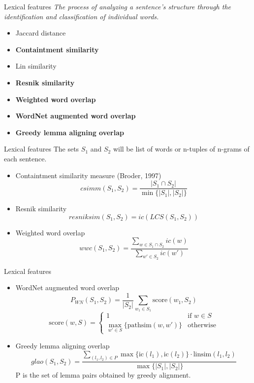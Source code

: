 \begin{frame}{Lexical features}
    \textit{The process of analyzing a sentence's structure through the identification and classification of individual words.}
    \vspace{0.5cm}
    \begin{itemize}
        \item Jaccard distance 
        \item \textbf{Containtment similarity}
        \item Lin similarity 
        \item \textbf{Resnik similarity }
        \item \textbf{Weighted word overlap}
        \item \textbf{WordNet augmented word overlap}
        \item \textbf{Greedy lemma aligning overlap}
    \end{itemize}
\end{frame}

    \begin{frame}{Lexical features}
        The sets $S_1$ and $S_2$ will be list of words or n-tuples of n-grams of each sentence. \\
        \begin{itemize}
            \item Containtment similarity measure (Broder, 1997)
            \[
            csimm(S_1,S_2) = \frac{\left| S_1 \cap S_2 \right|}{\min \{ \left| S_1 \right|, \left| S_2 \right| \}}
            \]
            \item Resnik similarity 
            \[resniksim(S_1,S_2) = ic(LCS(S_1,S_2)) \]
            \item Weighted word overlap 
            \[
            wwc(S_1, S_2) = 
            \frac{\sum_{w \in S_1 \cap S_2} ic(w)}{\sum_{w' \in S_2} ic(w')}
            \]
        \end{itemize}
\end{frame}

\begin{frame}{Lexical features}
    \begin{itemize}
    \item WordNet augmented word overlap 
    \[ P_{WN}(S_1, S_2) = \frac{1}{|S_2|} \sum_{w_1 \in S_1} \text{score}(w_1, S_2)\]
    \[
    \text{score}(w, S) = 
    \begin{cases} 
    1 & \text{if } w \in S \\ 
    \max_{w' \in S} \{\text{pathsim}(w, w')\} & \text{otherwise}
    \end{cases}
    \]
    \vspace{0.3cm}
\item Greedy lemma aligning overlap
    \[ glao(S_1, S_2) = \frac{\sum_{(l_1, l_2) \in P} \max \{ \text{ic}(l_1), \text{ic}(l_2) \} \cdot \text{linsim}(l_1, l_2)}{\max \{|S_1|, |S_2|\}} \]
    P is the set of lemma pairs obtained by greedy alignment.
\end{itemize}
\end{frame}

